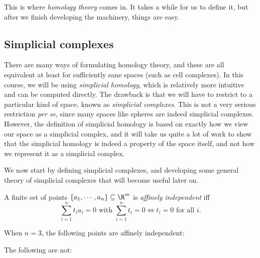 \documentclass[a4paper]{article}
\begin{document}
This is where \emph{homology theory} comes in. It takes a while for us to define it, but after we finish developing the machinery, things are easy.
\subsection{Simplicial complexes}
There are many ways of formulating homology theory, and these are all equivalent at least for sufficiently sane spaces (such as cell complexes). In this course, we will be using \emph{simplicial homology}, which is relatively more intuitive and can be computed directly. The drawback is that we will have to restrict to a particular kind of space, known as \emph{simplicial complexes}. This is not a very serious restriction \emph{per se}, since many spaces like spheres are indeed simplicial complexes. However, the definition of simplicial homology is based on exactly how we view our space as a simplicial complex, and it will take us quite a lot of work to show that the simplicial homology is indeed a property of the space itself, and not how we represent it as a simplicial complex.

We now start by defining simplicial complexes, and developing some general theory of simplicial complexes that will become useful later on.

\begin{defi}
  A finite set of points $\{a_1, \cdots, a_n\} \subseteq \R^m$ is \emph{affinely independent} iff
  \[
    \sum_{i = 1}^n t_i a_i = 0 \text{ with } \sum_{i = 1}^n t_i = 0 \Leftrightarrow t_i = 0\text{ for all }i.
  \]
\end{defi}

\begin{eg}
  When $n = 3$, the following points are affinely independent:
  \begin{center}
  \end{center}
  The following are not:
  \begin{center}
  \end{center}
\end{eg}
\end{document}

